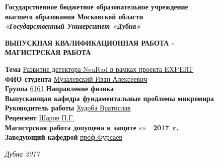 	\thispagestyle{empty}
	
	\begin{center}
		{\large\bf Государственное бюджетное образовательное учреждение} \\[1.0ex]
		{\large\bf высшего  образования Московской области}\\[1.0ex]
		{\large\bf\itshape «Государственный Университет «Дубна» }
	\end{center}
	\centerline{\hrulefill\hrulefill}
	
	\vspace{2.9cm}
	
	\begin{center}
		\large\bf ВЫПУСКНАЯ КВАЛИФИКАЦИОННАЯ РАБОТА -\\
		МАГИСТРСКАЯ РАБОТА
	\end{center}
	
	\vspace{2.9cm}
	
	\noindent
	{{\bf Тема}\quad
		\underline{Развитие детектора NeuRad в рамках проекта EXPERT}}\\
	
	\noindent
	{{\bf ФИО студента}\quad
		\underline{Музалевский Иван Алексеевич}}\\
	
	\noindent
	{{\bf Группа} \quad \underline{6161}\quad
		{\bf Направление физика}}\\
	
	\noindent
	{\bf Выпускающая кафедра фундаментальные проблемы микромира}\\
	
	\noindent
	{{\bf Руководитель работы} \hspace{1cm} \underline{
			Худоба Вратислав} \quad \underline{\hspace{3cm}}}\\
	
	\noindent
	{{\bf Рецензент}  \quad  \underline{Шаров П.Г.} \quad
		\underline{\hspace{3cm}}} \\
	
	\noindent
	{{\bf Магистрская работа допущена к защите}  \quad
		«\underline{\hspace{1cm}}» \underline{\hspace{2cm}}\,\, {\bf 2017\, г.}} 
	\\
	
	\noindent
	{{\bf Заведующий кафедрой} \hspace{3cm} \quad
		\underline{проф.Фурсаев}}
	
	\vspace{2.3cm}
	
	\centerline{\itshape{Дубна 2017}}
	